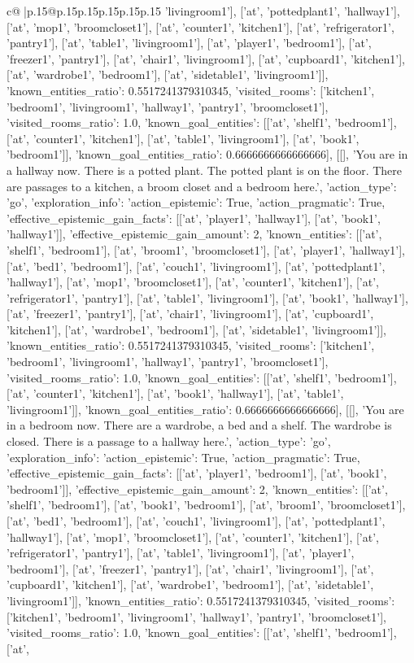 \documentclass{article}
\begin{document}
{\begin{supertabular}{c@{$\;$}|p{.15\linewidth}@{}p{.15\linewidth}p{.15\linewidth}p{.15\linewidth}p{.15\linewidth}p{.15\linewidth}}
{{{'livingroom1'], ['at', 'pottedplant1', 'hallway1'], ['at', 'mop1', 'broomcloset1'], ['at', 'counter1', 'kitchen1'], ['at', 'refrigerator1', 'pantry1'], ['at', 'table1', 'livingroom1'], ['at', 'player1', 'bedroom1'], ['at', 'freezer1', 'pantry1'], ['at', 'chair1', 'livingroom1'], ['at', 'cupboard1', 'kitchen1'], ['at', 'wardrobe1', 'bedroom1'], ['at', 'sidetable1', 'livingroom1']], 'known_entities_ratio': 0.5517241379310345, 'visited_rooms': ['kitchen1', 'bedroom1', 'livingroom1', 'hallway1', 'pantry1', 'broomcloset1'], 'visited_rooms_ratio': 1.0, 'known_goal_entities': [['at', 'shelf1', 'bedroom1'], ['at', 'counter1', 'kitchen1'], ['at', 'table1', 'livingroom1'], ['at', 'book1', 'bedroom1']], 'known_goal_entities_ratio': 0.6666666666666666}}], [[], 'You are in a hallway now. There is a potted plant. The potted plant is on the floor. There are passages to a kitchen, a broom closet and a bedroom here.', {'action_type': 'go', 'exploration_info': {'action_epistemic': True, 'action_pragmatic': True, 'effective_epistemic_gain_facts': [['at', 'player1', 'hallway1'], ['at', 'book1', 'hallway1']], 'effective_epistemic_gain_amount': 2, 'known_entities': [['at', 'shelf1', 'bedroom1'], ['at', 'broom1', 'broomcloset1'], ['at', 'player1', 'hallway1'], ['at', 'bed1', 'bedroom1'], ['at', 'couch1', 'livingroom1'], ['at', 'pottedplant1', 'hallway1'], ['at', 'mop1', 'broomcloset1'], ['at', 'counter1', 'kitchen1'], ['at', 'refrigerator1', 'pantry1'], ['at', 'table1', 'livingroom1'], ['at', 'book1', 'hallway1'], ['at', 'freezer1', 'pantry1'], ['at', 'chair1', 'livingroom1'], ['at', 'cupboard1', 'kitchen1'], ['at', 'wardrobe1', 'bedroom1'], ['at', 'sidetable1', 'livingroom1']], 'known_entities_ratio': 0.5517241379310345, 'visited_rooms': ['kitchen1', 'bedroom1', 'livingroom1', 'hallway1', 'pantry1', 'broomcloset1'], 'visited_rooms_ratio': 1.0, 'known_goal_entities': [['at', 'shelf1', 'bedroom1'], ['at', 'counter1', 'kitchen1'], ['at', 'book1', 'hallway1'], ['at', 'table1', 'livingroom1']], 'known_goal_entities_ratio': 0.6666666666666666}}], [[], 'You are in a bedroom now. There are a wardrobe, a bed and a shelf. The wardrobe is closed. There is a passage to a hallway here.', {'action_type': 'go', 'exploration_info': {'action_epistemic': True, 'action_pragmatic': True, 'effective_epistemic_gain_facts': [['at', 'player1', 'bedroom1'], ['at', 'book1', 'bedroom1']], 'effective_epistemic_gain_amount': 2, 'known_entities': [['at', 'shelf1', 'bedroom1'], ['at', 'book1', 'bedroom1'], ['at', 'broom1', 'broomcloset1'], ['at', 'bed1', 'bedroom1'], ['at', 'couch1', 'livingroom1'], ['at', 'pottedplant1', 'hallway1'], ['at', 'mop1', 'broomcloset1'], ['at', 'counter1', 'kitchen1'], ['at', 'refrigerator1', 'pantry1'], ['at', 'table1', 'livingroom1'], ['at', 'player1', 'bedroom1'], ['at', 'freezer1', 'pantry1'], ['at', 'chair1', 'livingroom1'], ['at', 'cupboard1', 'kitchen1'], ['at', 'wardrobe1', 'bedroom1'], ['at', 'sidetable1', 'livingroom1']], 'known_entities_ratio': 0.5517241379310345, 'visited_rooms': ['kitchen1', 'bedroom1', 'livingroom1', 'hallway1', 'pantry1', 'broomcloset1'], 'visited_rooms_ratio': 1.0, 'known_goal_entities': [['at', 'shelf1', 'bedroom1'], ['at', }}}
\end{supertabular}}
\end{document}
